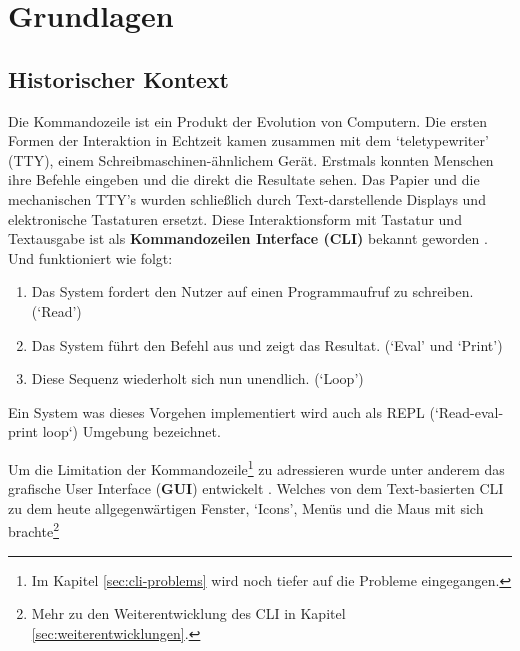 \documentclass[oneside,bibliography=totocnumbered,BCOR=5mm]{scrbook}
\begin{document}
\chapter{Grundlagen}
\label{sec:grundlagen}

\section{Historischer Kontext}
\label{sec:historic-context}

Die Kommandozeile ist ein Produkt der Evolution von Computern. Die ersten Formen
der Interaktion in Echtzeit kamen zusammen mit dem `teletypewriter' (TTY),
einem Schreibmaschinen-ähnlichem Gerät. Erstmals konnten Menschen ihre Befehle
eingeben und die direkt die Resultate sehen. Das Papier und die mechanischen
TTY's wurden schließlich durch Text-darstellende Displays und elektronische
Tastaturen ersetzt. Diese Interaktionsform mit Tastatur und Textausgabe ist als
\textbf{Kommandozeilen Interface (CLI)} bekannt geworden \parencite[35f]{nagarajan2018}.
Und funktioniert wie folgt:

\begin{enumerate}
  \item Das System fordert den Nutzer auf einen Programmaufruf zu schreiben. (`Read')
  \item Das System führt den Befehl aus und zeigt das Resultat. (`Eval' und `Print')
  \item Diese Sequenz wiederholt sich nun unendlich. (`Loop')
\end{enumerate}

Ein System was dieses Vorgehen implementiert wird auch als REPL (`Read-eval-print
loop`) Umgebung bezeichnet.

Um die Limitation der Kommandozeile\footnote{Im Kapitel \ref{sec:cli-problems}
wird noch tiefer auf die Probleme eingegangen.} zu adressieren wurde
unter anderem das grafische User Interface (\textbf{GUI}) entwickelt
\parencite{nielson1993}. Welches von dem Text-basierten CLI zu dem
heute allgegenwärtigen Fenster, `Icons', Menüs und die Maus mit sich
brachte\footnote{Mehr zu den Weiterentwicklung des CLI in Kapitel
\ref{sec:weiterentwicklungen}.}

\end{document}

